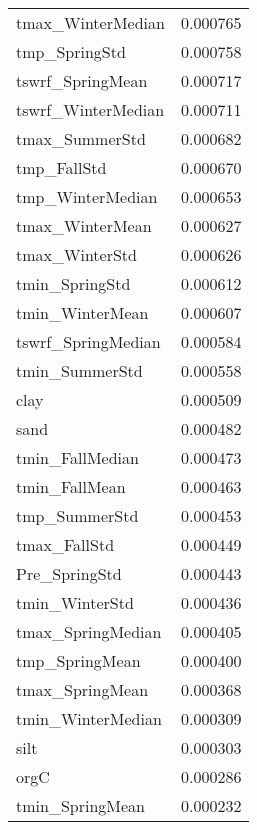 \begin{tabular}{lr}
tmax_WinterMedian & 0.000765 \\
tmp_SpringStd & 0.000758 \\
tswrf_SpringMean & 0.000717 \\
tswrf_WinterMedian & 0.000711 \\
tmax_SummerStd & 0.000682 \\
tmp_FallStd & 0.000670 \\
tmp_WinterMedian & 0.000653 \\
tmax_WinterMean & 0.000627 \\
tmax_WinterStd & 0.000626 \\
tmin_SpringStd & 0.000612 \\
tmin_WinterMean & 0.000607 \\
tswrf_SpringMedian & 0.000584 \\
tmin_SummerStd & 0.000558 \\
clay & 0.000509 \\
sand & 0.000482 \\
tmin_FallMedian & 0.000473 \\
tmin_FallMean & 0.000463 \\
tmp_SummerStd & 0.000453 \\
tmax_FallStd & 0.000449 \\
Pre_SpringStd & 0.000443 \\
tmin_WinterStd & 0.000436 \\
tmax_SpringMedian & 0.000405 \\
tmp_SpringMean & 0.000400 \\
tmax_SpringMean & 0.000368 \\
tmin_WinterMedian & 0.000309 \\
silt & 0.000303 \\
orgC & 0.000286 \\
tmin_SpringMean & 0.000232 \\
\bottomrule
\end{tabular}
